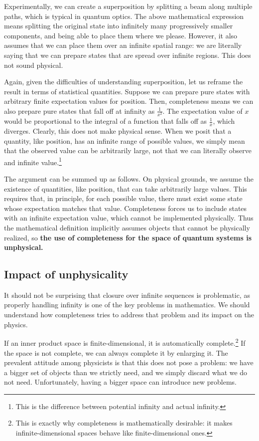 \documentclass[10pt,twocolumn, nofootinbib]{revtex4-2}
\begin{document}
Experimentally, we can create a superposition by splitting a beam along multiple paths, which is typical in quantum optics. The above mathematical expression means splitting the original state into infinitely many progressively smaller components, and being able to place them where we please. However, it also assumes that we can place them over an infinite spatial range: we are literally saying that we can prepare states that are spread over infinite regions. This does not sound physical.

Again, given the difficulties of understanding superposition, let us reframe the result in terms of statistical quantities. Suppose we can prepare pure states with arbitrary finite expectation values for position. Then, completeness means we can also prepare pure states that fall off at infinity as $\frac{1}{x^2}$. The expectation value of $x$ would be proportional to the integral of a function that falls off as $\frac{1}{x}$, which diverges. Clearly, this does not make physical sense. When we posit that a quantity, like position, has an infinite range of possible values, we simply mean that the observed value can be arbitrarily large, not that we can literally observe and infinite value.\footnote{This is the difference between potential infinity and actual infinity.}

The argument can be summed up as follows. On physical grounds, we assume the existence of quantities, like position, that can take arbitrarily large values. This requires that, in principle, for each possible value, there must exist some state whose expectation matches that value. Completeness forces us to include states with an infinite expectation value, which cannot be implemented physically. Thus the mathematical definition implicitly assumes objects that cannot be physically realized, so \textbf{the use of completeness for the space of quantum systems is unphysical.}

\subsection{Impact of unphysicality}

It should not be surprising that closure over infinite sequences is problematic, as properly handling infinity is one of the key problems in mathematics. We should understand how completeness tries to address that problem and its impact on the physics.

If an inner product space is finite-dimensional, it is automatically complete.\footnote{This is exactly why completeness is mathematically desirable: it makes infinite-dimensional spaces behave like finite-dimensional ones.} If the space is not complete, we can always complete it by enlarging it. The prevalent attitude among physicists is that this does not pose a problem: we have a bigger set of objects than we strictly need, and we simply discard what we do not need. Unfortunately, having a bigger space can introduce new problems.
\end{document}
